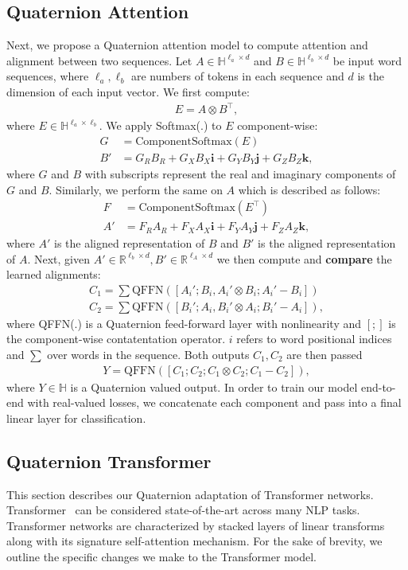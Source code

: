 \documentclass[11pt,a4paper]{article}
\def \bi {\mathbf{i}}
\def \bj {\mathbf{j}}
\def \bk {\mathbf{k}}
\begin{document}
\subsection{Quaternion Attention}
Next, we propose a Quaternion attention model to compute attention and alignment between two sequences. Let $A \in \mathbb{H}^{\ell_a \times d}$ and $B \in \mathbb{H}^{\ell_b \times d}$ be input word sequences, where $\ell_a, \ell_b$ are numbers of tokens in each sequence and $d$ is the dimension of each input vector. We first compute:
\begin{align*}
E = A \otimes B^{\top},
\end{align*}
where $E \in \mathbb{H}^{\ell_a \times \ell_b}$. We apply Softmax(.) to $E$ component-wise:
\begin{align*}
G &= \text{ComponentSoftmax}(E) \\
B' &= G_{R}B_{R} + G_{X}B_{X}\bi + G_YB_{Y}\bj + G_{Z}B_{Z}\bk,
\end{align*}
where $G$ and $B$ with subscripts represent the real and imaginary components of $G$ and $B$. Similarly, we perform the same on $A$ which is described as follows:
\begin{align*}
F &= \text{ComponentSoftmax}(E^{\top}) \\
A' &= F_{R}A_{R} + F_{X}A_{X}\bi + F_YA_{Y}\bj + F_{Z}A_{Z}\bk,
\end{align*}
where $A'$ is the aligned representation of $B$ and $B'$ is the aligned representation of $A$. Next, given $A' \in \mathbb{R}^{\ell_b \times d}, B' \in \mathbb{R}^{\ell_A \times d}$ we then compute and \textbf{compare} the learned alignments:
\begin{align*}
C_1 = \sum \text{QFFN}([A_i';B_i, A_i' \otimes B_i; A_i' - B_i]) \\
C_2 = \sum \text{QFFN}([B_i';A_i, B_i' \otimes A_i; B_i' - A_i]),
\end{align*}
where QFFN(.) is a Quaternion feed-forward layer with nonlinearity and $[;]$ is the component-wise contatentation operator. $i$ refers to word positional indices and $\sum$ over words in the sequence. Both outputs $C_1,C_2$ are then passed
\begin{align*}
Y = \text{QFFN}([C_1; C_2; C_1 \otimes C_2; C_1 - C_2]),
\end{align*}
where $Y \in \mathbb{H}$ is a Quaternion valued output. In order to train our model end-to-end with real-valued losses, we concatenate each component and pass into a final linear layer for classification.
\subsection{Quaternion Transformer}
This section describes our Quaternion adaptation of Transformer networks. Transformer~\cite{vaswani2017attention} can be considered state-of-the-art across many NLP tasks. Transformer networks are characterized by stacked layers of linear transforms along with its signature self-attention mechanism. For the sake of brevity, we outline the specific changes we make to the Transformer model.
\end{document}
